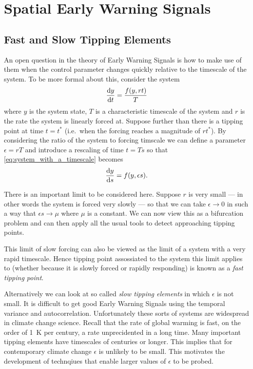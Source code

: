 \chapter{Spatial Early Warning Signals}
\graphicspath{{spatial_ews/figs/}}

\section{Fast and Slow Tipping Elements}
An open question in the theory of Early Warning Signals is how to make use of them when the control parameter
changes quickly relative to the timescale of the system\cite{VanderBolt2021}.
To be more formal about this, consider the system
\begin{equation}
  \label{eq:system_with_a_timescale}
  \dv{y}{t} = \frac{f(y,rt)}{T}
\end{equation}
where $y$ is the system state, $T$ is a characteristic timescale of the system and $r$ is the rate the system is linearly forced
at. Suppose further than there is a tipping point at time $t = t^*$ (i.e.\ when the forcing reaches a magnitude of $rt^*$). By considering
the ratio of the system to forcing timscale we can define a parameter $\epsilon = rT$ and introduce a rescaling of time $t=Ts$
so that \cref{eq:system_with_a_timescale} becomes
\begin{equation}
  \label{eq:system_with_a_timescale_rescaled}
  \dv{y}{s} = f(y,\epsilon s).
\end{equation}

There is an important limit to be considered here. Suppose $r$ is very small --- in other words the system is forced very slowly --- so that we
can take $\epsilon\rightarrow 0$ in such a way that $\epsilon s \rightarrow \mu$ where $\mu$ is a constant. We can now view this as a bifurcation
problem and can then apply all the usual tools to detect approaching tipping points\cite{scheffer2009}.

This limit of slow forcing can also be viewed as the limit of a system with a very rapid timescale. Hence tipping point assossiated to the system
this limit applies to (whether because it is slowly forced or rapidly responding) is known as a \emph{fast tipping point}.

Alternatively we can look at so called \emph{slow tipping elements} in which $\epsilon$ is not small. It is difficult to get good Early Warning Signals
using the temporal variance and autocorrelation\cite{VanderBolt2021}. Unfortunately these sorts of systems are widespread in climate change science.
Recall that the rate of global warming is fast, on the order of \SI{1}{\kelvin} per century\cite{Osborn2021}, a rate unprecidented in
a long time. Many important tipping elements have timescales of centuries or longer.
This implies that for contemporary climate change $\epsilon$ is unlikely to be small. This motivates the development of technqiues that enable
larger values of $\epsilon$ to be probed.

